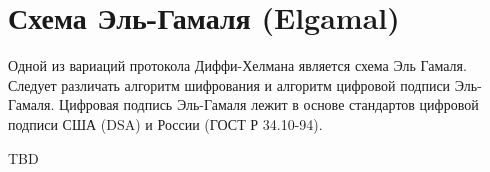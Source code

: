 \section{Схема Эль-Гамаля (Elgamal)}
Одной из вариаций протокола Диффи-Хелмана является схема Эль
Гамаля. Следует различать алгоритм шифрования и алгоритм цифровой
подписи Эль-Гамаля. Цифровая подпись Эль-Гамаля лежит в основе
стандартов цифровой подписи США (DSA) и России (ГОСТ Р 34.10-94).

TBD
